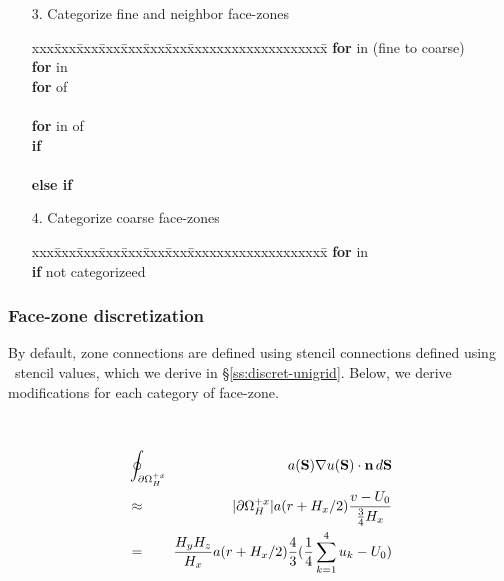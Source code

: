 \documentclass[10pt]{article}
\begin{document}
\begin{itemize}
\item[3.] Categorize fine and neighbor face-zones
\begin{tabbing}
xxx\=xxx\=xxx\=xxx\=xxx\=xxx\=xxx\=xxxxxxxxxxxxxxxxxxx\=\kill
\> \textbf{for}  in  (fine to coarse) \\
\>\> \textbf{for}  in  \\
\>\>\> \textbf{for}  of  \\
\>\>\>\>  \\
\>\>\>\> \textbf{for}  in  of \\
\>\>\>\>\> \textbf{if}  \\
\>\>\>\>\>\>  \\
\>\>\>\>\> \textbf{else if}  \\
\>\>\>\>\>\> 
\end{tabbing}
\item[4.] Categorize coarse face-zones
\begin{tabbing}
xxx\=xxx\=xxx\=xxx\=xxx\=xxx\=xxx\=xxxxxxxxxxxxxxxxxxx\=\kill
\> \textbf{for}  in  \\
\>\> \textbf{if}  not categorizeed \\
\>\>\>        
\end{tabbing}
\end{itemize}


\subsubsection{Face-zone discretization}

By default, zone connections are defined using stencil connections defined
using \hypre\ stencil values, which we derive in \S\ref{ss:discret-unigrid}.
Below, we derive modifications for each category of face-zone.


\begin{minipage}{1.75in}
\end{minipage} \ \ \ \ 
\begin{minipage}{4.00in}
\begin{eqnarray*}
& \oint_{\partial\Omega_H^{+x}}  \!\!\! & a(\textbf{S}) \nabla u(\textbf{S})\cdot \textbf{n} \, d\textbf{S}  \\
& \approx & |\partial\Omega_H^{+x}| a(r+H_x/2) \frac{v - U_0}{\frac{3}{4}H_x} \\
& = & \frac{H_yH_z}{H_x} a(r+H_x/2) \frac{4}{3} (\frac{1}{4} \sum_{k=1}^4 u_k - U_0)   \\
\end{eqnarray*}
\end{minipage}
\end{document}
